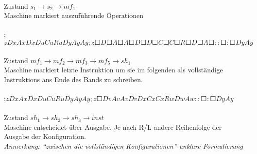 \documentclass[10pt, a4paper]{article}
\begin{document}
\paragraph{}
Zustand $s_1 \rightarrow s_2 \rightarrow mf_1$\\
Maschine markiert auszuführende Operationen\\

\begin{small}
\par
\paragraph{}
;$z D x  A x  D x  D u  C u R u  D y  A y  A y ; z  \Square D \Square  A \Square  A \Square  D \Square  D \Square  C \Square  C \Square  R \Square  D \Square  A  \Square  ::\Square : \Square D y A y$
\end{small}\par

\paragraph{}
Zustand $mf_1 \rightarrow mf_2 \rightarrow mf_3 \rightarrow mf_5 \rightarrow sh_1$\\
Maschine markiert letzte Instruktion um sie im folgenden als vollständige Instruktions ans Ende des Bands zu schreiben.\\

\begin{small}
\par
\paragraph{}
;$z D x  A x  D x  D u  C u R u  D y  A y  A y ; z  \Square D v  A v  A v  D v  D x  C x  C x  R w  D w  A  w  :: \Square : \Square D y A y$
\end{small}\par

\paragraph{}
Zustand $sh_1\rightarrow sh_2 \rightarrow sh_3 \rightarrow inst$\\
Maschine entscheidet über Ausgabe. Je nach R/L andere Reihenfolge der Ausgabe der Konfiguration.\\
\textit{Anmerkung: \enquote{zwischen die vollständigen Konfigurationen} unklare Formulierung}\\
\end{document}

